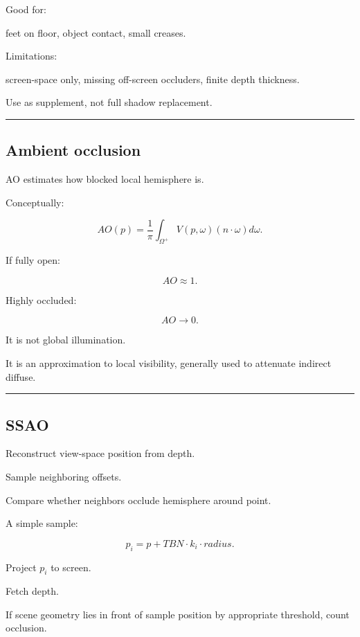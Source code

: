 Good for:

feet on floor, object contact, small creases.

Limitations:

screen-space only, missing off-screen occluders, finite depth thickness.

Use as supplement, not full shadow replacement.

\begin{center}\rule{0.5\linewidth}{0.5pt}\end{center}

\subsection{Ambient occlusion}\label{04-visual-computing-ii-ch040-ambient-occlusion}

AO estimates how blocked local hemisphere is.

Conceptually:

\[
\boxed{
AO(p)
=
\frac1\pi
\int_{\Omega^+}
V(p,\omega)
(n\cdot\omega)
d\omega.
}
\]

If fully open:

\[
AO\approx1.
\]

Highly occluded:

\[
AO\rightarrow0.
\]

It is not global illumination.

It is an approximation to local visibility, generally used to attenuate indirect diffuse.

\begin{center}\rule{0.5\linewidth}{0.5pt}\end{center}

\subsection{SSAO}\label{04-visual-computing-ii-ch040-ssao}

Reconstruct view-space position from depth.

Sample neighboring offsets.

Compare whether neighbors occlude hemisphere around point.

A simple sample:

\[
p_i=
p+
TBN\cdot k_i\cdot radius.
\]

Project \(p_i\) to screen.

Fetch depth.

If scene geometry lies in front of sample position by appropriate threshold, count occlusion.

